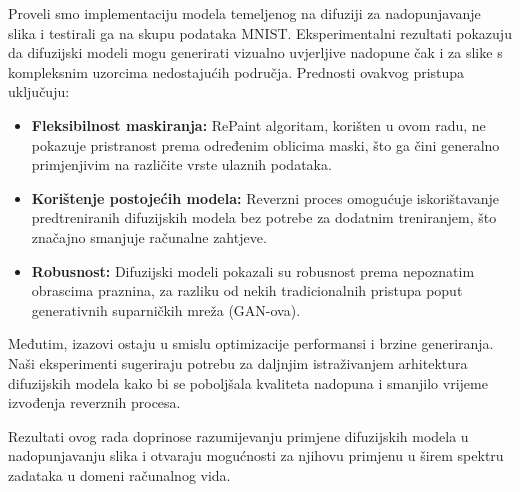 \documentclass[10pt, a4paper, croatian]{article}
\begin{document}
Proveli smo implementaciju modela temeljenog na difuziji za nadopunjavanje slika i testirali ga na skupu podataka MNIST. Eksperimentalni rezultati pokazuju da difuzijski modeli mogu generirati vizualno uvjerljive nadopune čak i za slike s kompleksnim uzorcima nedostajućih područja. Prednosti ovakvog pristupa uključuju:

\begin{itemize}
    \item \textbf{Fleksibilnost maskiranja:} RePaint algoritam, korišten u ovom radu, ne pokazuje pristranost prema određenim oblicima maski, što ga čini generalno primjenjivim na različite vrste ulaznih podataka.
    \item \textbf{Korištenje postojećih modela:} Reverzni proces omogućuje iskorištavanje predtreniranih difuzijskih modela bez potrebe za dodatnim treniranjem, što značajno smanjuje računalne zahtjeve.
    \item \textbf{Robusnost:} Difuzijski modeli pokazali su robusnost prema nepoznatim obrascima praznina, za razliku od nekih tradicionalnih pristupa poput generativnih suparničkih mreža (GAN-ova).
\end{itemize}

Međutim, izazovi ostaju u smislu optimizacije performansi i brzine generiranja. Naši eksperimenti sugeriraju potrebu za daljnjim istraživanjem arhitektura difuzijskih modela kako bi se poboljšala kvaliteta nadopuna i smanjilo vrijeme izvođenja reverznih procesa.

Rezultati ovog rada doprinose razumijevanju primjene difuzijskih modela u nadopunjavanju slika i otvaraju mogućnosti za njihovu primjenu u širem spektru zadataka u domeni računalnog vida.




 
\end{document}
